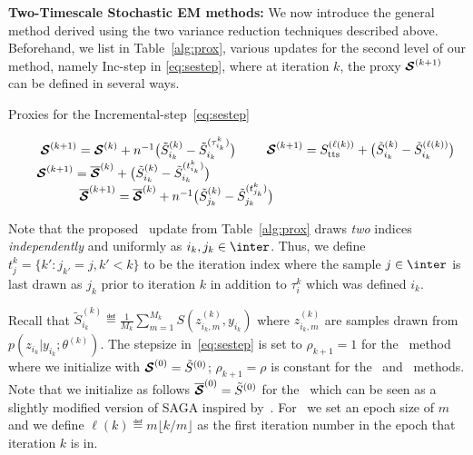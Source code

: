 \documentclass[journal, 11pt]{IEEEtran}
\makeatletter
\newcounter{protocol}
\newenvironment{protocol}[1][htb]{%
  \let\c@algorithm\c@protocol
  \renewcommand{\ALG@name}{Protocol}%
  \begin{algorithm}[#1]%
  }{\end{algorithm}
}
\makeatother
\begin{document}
\vspace{0.08in}
\noindent \textbf{Two-Timescale Stochastic EM methods:}
We now introduce the general method derived using the two variance reduction techniques described above.
Beforehand, we list in Table~\ref{alg:prox}, various updates for the second level of our method, namely \textsf{Inc-step} in \eqref{eq:sestep}, where at iteration $k$, the proxy ${\bm{\mathcal{S}}}^{(k+1)}$ can be defined in several ways.

 \begin{protocol}[H]
\caption{Proxies for the Incremental-step~\eqref{eq:sestep}}\label{alg:prox}
  \begin{algorithmic}[1]
  \STATE \textsf{\ISAEM\ }$\hspace{0.7cm} \StocEstep^{(k+1)} = \StocEstep^{(k)} + n^{-1} \big( \tilde{S}_{i_k}^{(k)}  - \tilde{S}_{i_k}^{(\tau_{i_k}^k)} \big) \label{eq:isaem}$
    \STATE \textsf{\SAEMVR\ }$\hspace{0.5cm} \StocEstep^{(k+1)}  = \stt^{(\ell(k))} +  \big( \tilde{S}_{i_k}^{(k)}  -\tilde{S}_{i_k}^{(\ell(k))}   \big) \label{eq:vrsaem}$
      \STATE \textsf{\FISAEM\ }$\hspace{0.6cm} \StocEstep^{(k+1)} = \overline{\StocEstep}^{(k)} + \big( \tilde{S}_{i_k}^{(k)}  - \tilde{S}_{i_k}^{(t_{i_k}^k)} \big) \label{eq:fisaem}$\\
             $ \hspace{1.95cm} \overline{{\bm{\mathcal{S}}}}^{(k+1)} = \overline{{\bm{\mathcal{S}}}}^{(k)} + n^{-1} \big( \tilde{S}_{j_k}^{(k)}  - \tilde{S}_{j_k}^{(t_{j_k}^k)} \big)$
  \end{algorithmic}
\end{protocol}

Note that the proposed \FISAEM\ update from Table~\ref{alg:prox} draws \emph{two} indices \emph{independently} and uniformly as $i_k, j_k \in \inter$. 
Thus, we define $t_j^k = \{ k' : j_{k'} = j , k' < k \}$ to be the iteration index where the sample $j \in \inter$ is last drawn as $j_k$ prior to iteration $k$ in addition to $\tau_i^k$ which was defined \wrt $i_k$.

Recall that $\tilde{S}_{i_k}^{(k)} \eqdef  \frac{1}{M_k} \sum_{m=1}^{M_k} S(z_{i_k,m}^{(k)}, y_{i_k})$ where $z_{i_k,m}^{(k)}$ are samples drawn from $ p(z_{i_k}|y_{i_k};\theta^{(k)})$.
The stepsize in~\eqref{eq:sestep} is set to $\rho_{k+1} = 1$ for the \ISAEM\ method where we initialize with ${\bm{\mathcal{S}}}^{(0)} = \tilde{S}^{(0)}$; $\rho_{k+1} = \rho$ is  constant for the \SAEMVR\ and \FISAEM\ methods. Note that we initialize as follows $\overline{{\bm{\mathcal{S}}}}^{(0)} = \tilde{S}^{(0)}$ for the \FISAEM\ which can be seen as a slightly modified version of SAGA inspired by~\cite{reddi2016fast}.
For \SAEMVR\, we set an epoch size of $m$ and we define $\ell(k) \eqdef m \lfloor k/m \rfloor$ as the first iteration number in the epoch that iteration $k$ is in.
\end{document}
